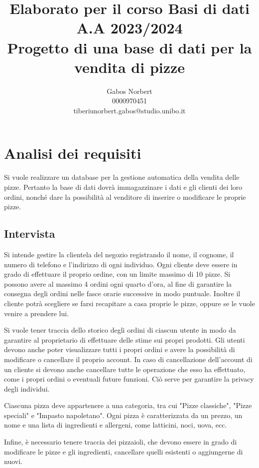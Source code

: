 \documentclass[a4paper,12pt, oneside]{article}
\title{\textbf{Elaborato per il corso Basi di dati} \\ \large A.A 2023/2024 \\ Progetto di una base di dati per la vendita di pizze}
\author{Gabos Norbert \\ 0000970451 \\ tiberiunorbert.gabos@studio.unibo.it }
\date{}
\begin{document}
\maketitle

\newpage
\tableofcontents{}
\newpage

\section{Analisi dei requisiti}

Si vuole realizzare un database per la gestione automatica della vendita
delle pizze. Pertanto la base di dati dovrà immagazzinare i dati e gli
clienti dei loro ordini, nonché dare la possibilità al venditore di
inserire o modificare le proprie pizze.

\subsection{Intervista}

Si intende gestire la clientela del negozio registrando il nome, il
cognome, il numero di telefono e l'indirizzo di ogni individuo. Ogni
cliente deve essere in grado di effettuare il proprio ordine, con un
limite massimo di 10 pizze. Si possono avere al massimo 4 ordini ogni
quarto d'ora, al fine di garantire la consegna degli ordini nelle
fasce orarie successive in modo puntuale.
Inoltre il cliente potrà scegliere se farsi recapitare a casa proprie
le pizze, oppure se le vuole venire a prendere lui.

Si vuole tener traccia dello storico degli ordini di ciascun utente in
modo da garantire al proprietario di effettuare delle stime sui propri
prodotti. Gli utenti devono anche poter visualizzare tutti i propri
ordini e avere la possibilità di modificare o cancellare il proprio
account. In caso di cancellazione dell'account di un cliente si devono
anche cancellare tutte le operazione che esso ha effettuato, come i
propri ordini o eventuali future funzioni. Ciò serve per garantire la
privacy degli individui.

Ciascuna pizza deve appartenere a una categoria, tra cui "Pizze
classiche", "Pizze speciali" e "Impasto napoletano". Ogni pizza è
caratterizzata da un prezzo, un nome e una lista di ingredienti e
allergeni, come latticini, noci, uova, ecc.

Infine, è necessario tenere traccia dei pizzaioli, che devono essere
in grado di modificare le pizze e gli ingredienti, cancellare quelli
esistenti o aggiungerne di nuovi.
\end{document}
